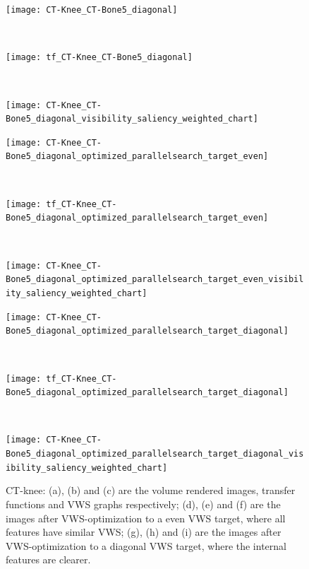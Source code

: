 \begin{figure}
	\centering
	\begin{minipage}{.9\textwidth}%
		\begin{minipage}{.3\textwidth}
			\texttt{[image: CT-Knee\_CT-Bone5\_diagonal]}
			\subcaption{}
		\end{minipage}~
		\begin{minipage}{.3\textwidth}
			\texttt{[image: tf\_CT-Knee\_CT-Bone5\_diagonal]}
			\subcaption{}
		\end{minipage}~
		\begin{minipage}{.4\textwidth}
			\texttt{[image: CT-Knee\_CT-Bone5\_diagonal\_visibility\_saliency\_weighted\_chart]}
			\subcaption{}
		\end{minipage}
		
		\begin{minipage}{.3\textwidth}
			\texttt{[image: CT-Knee\_CT-Bone5\_diagonal\_optimized\_parallelsearch\_target\_even]}
			\subcaption{}
		\end{minipage}~
		\begin{minipage}{.3\textwidth}
			\texttt{[image: tf\_CT-Knee\_CT-Bone5\_diagonal\_optimized\_parallelsearch\_target\_even]}
			\subcaption{}
		\end{minipage}~
		\begin{minipage}{.4\textwidth}
			\texttt{[image: CT-Knee\_CT-Bone5\_diagonal\_optimized\_parallelsearch\_target\_even\_visibility\_saliency\_weighted\_chart]}
			\subcaption{}
		\end{minipage}
		
		\begin{minipage}{.3\textwidth}
			\texttt{[image: CT-Knee\_CT-Bone5\_diagonal\_optimized\_parallelsearch\_target\_diagonal]}
			\subcaption{}
		\end{minipage}~
		\begin{minipage}{.3\textwidth}
			\texttt{[image: tf\_CT-Knee\_CT-Bone5\_diagonal\_optimized\_parallelsearch\_target\_diagonal]}
			\subcaption{}
		\end{minipage}~
		\begin{minipage}{.4\textwidth}
			\texttt{[image: CT-Knee\_CT-Bone5\_diagonal\_optimized\_parallelsearch\_target\_diagonal\_visibility\_saliency\_weighted\_chart]}
			\subcaption{}
		\end{minipage}
	\end{minipage}
	\caption[CT-Knee: volume rendered images, transfer functions and VWS graphs]{CT-knee: (a), (b) and (c) are the volume rendered images, transfer functions and VWS graphs respectively; (d), (e) and (f) are the images after VWS-optimization to a even VWS target, where all features have similar VWS; (g), (h) and (i) are the images after VWS-optimization to a diagonal VWS target, where the internal features are clearer.
	}
	\label{fig:CT-Knee_CT-Bone5_diagonal}
\end{figure}


